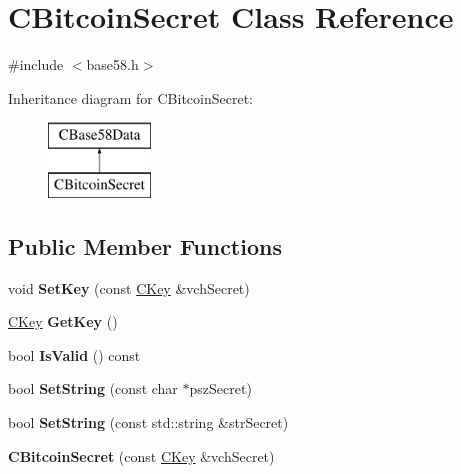 \hypertarget{class_c_bitcoin_secret}{}\section{C\+Bitcoin\+Secret Class Reference}
\label{class_c_bitcoin_secret}


{\ttfamily \#include $<$base58.\+h$>$}

Inheritance diagram for C\+Bitcoin\+Secret\+:\begin{figure}[H]
\begin{center}
\leavevmode
\includegraphics[height=2.000000cm]{class_c_bitcoin_secret}
\end{center}
\end{figure}
\subsection*{Public Member Functions}
\begin{DoxyCompactItemize}
\item 
\mbox{\label{class_c_bitcoin_secret_a3629c0fce320664c3c07cb082939d6ec}} 
void {\bfseries Set\+Key} (const \mbox{\hyperlink{class_c_key}{C\+Key}} \&vch\+Secret)
\item 
\mbox{\label{class_c_bitcoin_secret_a4d6bf559d092e6d47f8001c7171096df}} 
\mbox{\hyperlink{class_c_key}{C\+Key}} {\bfseries Get\+Key} ()
\item 
\mbox{\label{class_c_bitcoin_secret_a2a93fa8a09826ff63498cb3e4370c154}} 
bool {\bfseries Is\+Valid} () const
\item 
\mbox{\label{class_c_bitcoin_secret_a6a8aff02f66099f33f573ad3e6375bb1}} 
bool {\bfseries Set\+String} (const char $\ast$psz\+Secret)
\item 
\mbox{\label{class_c_bitcoin_secret_a83cfc3b34aac494efdd6e316cd08626d}} 
bool {\bfseries Set\+String} (const std\+::string \&str\+Secret)
\item 
\mbox{\label{class_c_bitcoin_secret_a0358baa459a1f22661b601d9d83eacf8}} 
{\bfseries C\+Bitcoin\+Secret} (const \mbox{\hyperlink{class_c_key}{C\+Key}} \&vch\+Secret)
\end{DoxyCompactItemize}
